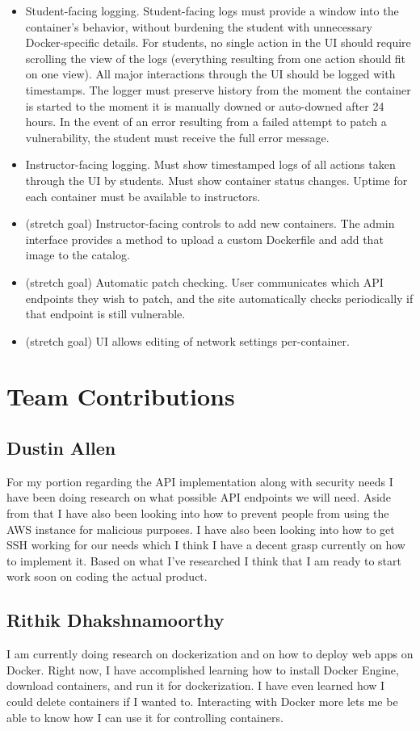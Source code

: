 \documentclass[12pt]{article}
\begin{document}
\begin{itemize}
	\item Student-facing logging. Student-facing logs must provide a window into the container's behavior, without burdening the student with unnecessary Docker-specific details. For students, no single action in the UI should require scrolling the view of the logs (everything resulting from one action should fit on one view). All major interactions through the UI should be logged with timestamps. The logger must preserve history from the moment the container is started to the moment it is manually downed or auto-downed after 24 hours. In the event of an error resulting from a failed attempt to patch a vulnerability, the student must receive the full error message.
	\item Instructor-facing logging. Must show timestamped logs of all actions taken through the UI by students. Must show container status changes. Uptime for each container must be available to instructors.
	\item (stretch goal) Instructor-facing controls to add new containers. The admin interface provides a method to upload a custom Dockerfile and add that image to the catalog.
	\item (stretch goal) Automatic patch checking. User communicates which API endpoints they wish to patch, and the site automatically checks periodically if that endpoint is still vulnerable.
	\item (stretch goal) UI allows editing of network settings per-container.
\end{itemize}

\section{Team Contributions}
\subsection{Dustin Allen}
For my portion regarding the API implementation along with security needs I have been doing research on what possible API endpoints we will need. Aside from that I have also been looking into how to prevent people from using the AWS instance for malicious purposes. I have also been looking into how to get SSH working for our needs which I think I have a decent grasp currently on how to implement it. Based on what I’ve researched I think that I am ready to start work soon on coding the actual product.

\subsection{Rithik Dhakshnamoorthy}
I am currently doing research on dockerization and on how to deploy web apps on Docker. Right now, I have accomplished learning how to install Docker Engine, download containers, and run it for dockerization. I have even learned how I could delete containers if I wanted to. Interacting with Docker more lets me be able to know how I can use it for controlling containers.
\end{document}
